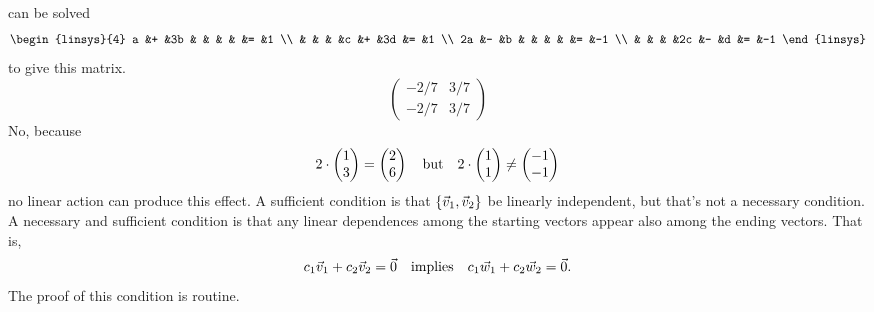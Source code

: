 \begin{exercises}
\begin{answer}
\begin{exparts}
         can be solved
         \begin{equation*}
           \begin{linsys}{4}
             a  &+  &3b  &   &   &   &   &=  &1  \\
                &   &    &   &c  &+  &3d &=  &1  \\
            2a  &-  &b   &   &   &   &   &=  &-1 \\
                &   &    &   &2c &-  &d  &=  &-1 
           \end{linsys}
         \end{equation*}
         to give this matrix.
         \begin{equation*}
           \begin{pmatrix}
             -2/7  &3/7 \\
             -2/7  &3/7 
           \end{pmatrix}
         \end{equation*}
       \partsitem No, because
         \begin{equation*}
           2\cdot\begin{pmatrix} 1 \\ 3 \end{pmatrix}=\begin{pmatrix} 2 \\ 6 \end{pmatrix}
           \quad\text{but}\quad
           2\cdot\begin{pmatrix} 1 \\ 1 \end{pmatrix}\neq\begin{pmatrix} -1 \\ -1 \end{pmatrix}
         \end{equation*}
         no linear action can produce this effect.
       \partsitem A sufficient condition is that 
         \( \mbox{$\{\vec{v}_1,\vec{v}_2\}$} \) be linearly independent, but
         that's not a necessary condition.
         A necessary and sufficient condition is that any linear dependences
         among the starting vectors appear also among the ending vectors.
         That is,
         \begin{equation*}
           c_1\vec{v}_1+c_2\vec{v}_2=\vec{0}
           \quad\text{implies}\quad
           c_1\vec{w}_1+c_2\vec{w}_2=\vec{0}.
         \end{equation*}
         The proof of this condition is routine.
     \end{exparts} 
   \end{answer}
\end{exercises}

















